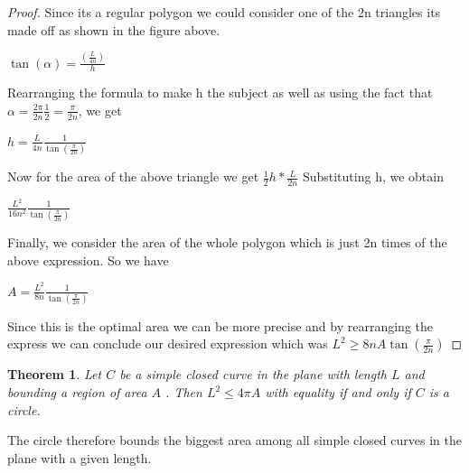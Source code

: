 \documentclass[a4paper]{book}
\newtheorem{theorem}{Theorem}%
\numberwithin{theorem}{section}%
\begin{document}
\begin{proof}
        Since its a regular polygon we could consider one of the 2n triangles its made off as shown in the figure above. 
    \begin{center}
        $\displaystyle \tan(\alpha)=\frac{(\frac{L}{4n})}{h}$
    \end{center}
        Rearranging the formula to make h the subject as well as using the fact that $\alpha=\frac{2\pi}{2n} \frac{1}{2}=\frac{\pi}{2n}$, we get 
    \begin{center}
        $\displaystyle h=\frac{L}{4n} \frac{1}{\tan(\frac{\pi}{2n})}$
    \end{center}
    Now for the area of the above triangle we get $\displaystyle \frac{1}{2}h*\frac{L}{2n}$
        Substituting h, we obtain
    \begin{center}
        $\displaystyle \frac{L^{2}}{16n^{2}} \frac{1}{\tan(\frac{\pi}{2n})}$
    \end{center}
        Finally, we consider the area of the whole polygon which is just 2n times of the above expression. So we have 
    \begin{center}
            $\displaystyle A=\frac{L^{2}}{8n} \frac{1}{\tan(\frac{\pi}{2n})}$
    \end{center}
        Since this is the optimal area we can be more precise and by rearranging the express we can conclude our desired expression which was $L^{2} \ge 8nA\tan(\frac{\pi}{2n})$
\end{proof}

\begin{theorem}
    Let $C$ be a simple closed curve in the plane with length $L$ and bounding a region of area $A$ . 
    Then $L^2 \leq 4\pi A$ with equality if and only if $C$ is a circle.
\end{theorem}
The circle therefore bounds the biggest area among all simple closed curves in the plane with a given length.
\end{document}
